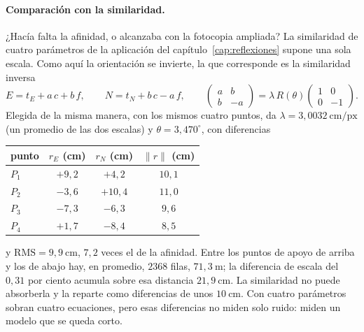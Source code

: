\paragraph{Comparación con la similaridad.} ¿Hacía falta la afinidad, o alcanzaba con la
fotocopia ampliada? La similaridad de cuatro parámetros de la
aplicación del capítulo~\ref{cap:reflexiones} supone una sola escala. Como aquí la orientación se
invierte, la que corresponde es la similaridad inversa
\[
  E=t_E+a\,c+b\,f,\qquad N=t_N+b\,c-a\,f,
  \qquad
  \begin{pmatrix}a&b\\b&-a\end{pmatrix}=\lambda\,R(\theta)\begin{pmatrix}1&0\\0&-1\end{pmatrix}.
\]
Elegida de la misma manera, con los mismos cuatro puntos, da
\(\lambda=3{,}0032\ \mathrm{cm/px}\) (un promedio de las dos escalas) y \(\theta=3{,}470^\circ\),
con diferencias
\begin{center}
\begin{tabular}{lccc}
\toprule
punto & \(r_E\) (cm) & \(r_N\) (cm) & \(\lVert r\rVert\) (cm)\\
\midrule
\(P_1\) & \(+9{,}2\) & \(+4{,}2\) & \(10{,}1\)\\
\(P_2\) & \(-3{,}6\) & \(+10{,}4\) & \(11{,}0\)\\
\(P_3\) & \(-7{,}3\) & \(-6{,}3\) & \(9{,}6\)\\
\(P_4\) & \(+1{,}7\) & \(-8{,}4\) & \(8{,}5\)\\
\bottomrule
\end{tabular}
\end{center}
y \(\mathrm{RMS}=9{,}9\ \mathrm{cm}\), \(7{,}2\) veces el de la afinidad. Entre los puntos de apoyo
de arriba y los de abajo hay, en promedio, \(2368\) filas, \(71{,}3\ \mathrm{m}\); la diferencia
de escala del \(0{,}31\) por ciento acumula sobre esa distancia \(21{,}9\ \mathrm{cm}\). La
similaridad no puede absorberla y la reparte como diferencias de unos \(10\ \mathrm{cm}\). Con
cuatro parámetros sobran cuatro ecuaciones, pero esas diferencias no miden solo ruido: miden un
modelo que se queda corto.

